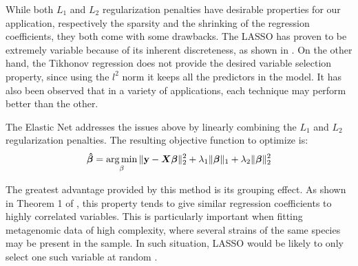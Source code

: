While both $L_1$ and $L_2$ regularization penalties have desirable properties for our application, respectively the sparsity and the shrinking of the regression coefficients, they both come with some drawbacks. The LASSO has proven to be extremely variable because of its inherent discreteness, as shown in \cite{breiman_heuristics_1996}. On the other hand, the Tikhonov regression does not provide the desired variable selection property, since using the $l^2$ norm it keeps all the predictors in the model. It has also been observed that in a variety of applications, each technique may perform better than the other.

The Elastic Net addresses the issues above by linearly combining the $L_1$ and $L_2$ regularization penalties. The resulting objective function to optimize is:
\begin{equation*}
    \boldsymbol{\hat{\beta}} = \operatorname*{arg\,min}_{\beta}{\lVert\mathbf{y} - \boldsymbol{X}\boldsymbol{\beta}\rVert_2^2} + \lambda_1 \lVert\boldsymbol{\beta}\rVert_1 + \lambda_2\lVert\boldsymbol{\beta}\rVert_2^2
\end{equation*}

The greatest advantage provided by this method is its grouping effect. As shown in Theorem 1 of \cite{zou_regularization_2005}, this property tends to give similar regression coefficients to highly correlated variables. This is particularly important when fitting metagenomic data of high complexity, where several strains of the same species may be present in the sample. In such situation, LASSO would be likely to only select one such variable at random \cite{zou_regularization_2005}.


